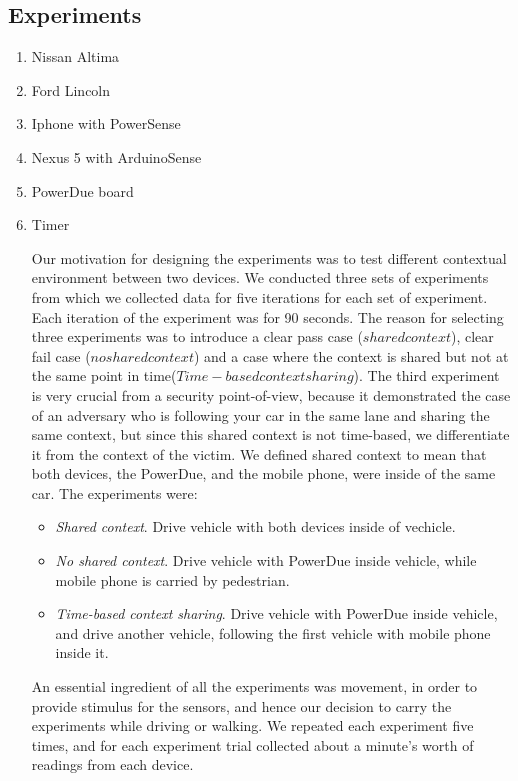 \documentclass[journal]{IEEEtranTIE}
\begin{document}
\subsection{Experiments}

\begin{enumerate}
\item Nissan Altima
\item Ford Lincoln
\item Iphone with PowerSense
\item Nexus 5 with ArduinoSense
\item PowerDue board
\item Timer
\begin{enumerate}

Our motivation for designing the experiments was to test different contextual environment 
between two devices. We conducted three sets of experiments from which we collected data for 
five iterations for each set of experiment. Each iteration of the experiment was for 90 seconds. 
The reason for selecting three experiments was to introduce a clear pass case ($shared context$),
clear fail case ($no shared context$) and a case where the context is shared but not at the same 
point in time($Time-based context sharing$). The third experiment is very crucial from a security
point-of-view, because it demonstrated the case of an adversary who is following your car in the
same lane and sharing the same context, but since this shared context is not time-based, we 
differentiate it from the context of the victim. We defined shared context to mean that both 
devices, the PowerDue, and the mobile phone, were inside of the same car. The experiments were:

\begin{itemize}
\item \textit{Shared context}. Drive vehicle with both devices inside of
      vechicle.
\item \textit{No shared context}. Drive vehicle with PowerDue inside vehicle,
      while mobile phone is carried by pedestrian.
\item \textit{Time-based context sharing}. Drive vehicle with PowerDue inside 
vehicle, and drive another vehicle, following the first vehicle with mobile 
phone inside it.
\end{itemize}

An essential ingredient of all the experiments was movement, in order to provide
stimulus for the sensors, and hence our decision to carry the experiments while
driving or walking. We repeated each experiment five times, and for each
experiment trial collected about a minute's worth of readings from each device.


\end{enumerate}
\end{enumerate}
\end{document}
